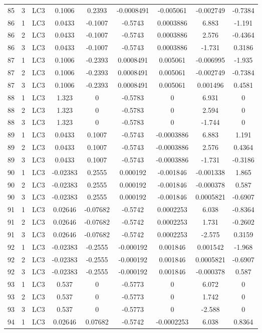 \documentclass{article}%
\begin{document}
\begin{longtable}{| c c c | c c c c c c |}
85&3&LC3&0.1006&0.2393&{-}0.0008491&{-}0.005061&{-}0.002749&{-}0.7384\\%
86&1&LC3&0.0433&{-}0.1007&{-}0.5743&0.0003886&6.883&{-}1.191\\%
86&2&LC3&0.0433&{-}0.1007&{-}0.5743&0.0003886&2.576&{-}0.4364\\%
86&3&LC3&0.0433&{-}0.1007&{-}0.5743&0.0003886&{-}1.731&0.3186\\%
87&1&LC3&0.1006&{-}0.2393&0.0008491&0.005061&{-}0.006995&{-}1.935\\%
87&2&LC3&0.1006&{-}0.2393&0.0008491&0.005061&{-}0.002749&{-}0.7384\\%
87&3&LC3&0.1006&{-}0.2393&0.0008491&0.005061&0.001496&0.4581\\%
88&1&LC3&1.323&0&{-}0.5783&0&6.931&0\\%
88&2&LC3&1.323&0&{-}0.5783&0&2.594&0\\%
88&3&LC3&1.323&0&{-}0.5783&0&{-}1.744&0\\%
89&1&LC3&0.0433&0.1007&{-}0.5743&{-}0.0003886&6.883&1.191\\%
89&2&LC3&0.0433&0.1007&{-}0.5743&{-}0.0003886&2.576&0.4364\\%
89&3&LC3&0.0433&0.1007&{-}0.5743&{-}0.0003886&{-}1.731&{-}0.3186\\%
90&1&LC3&{-}0.02383&0.2555&0.000192&{-}0.001846&{-}0.001338&1.865\\%
90&2&LC3&{-}0.02383&0.2555&0.000192&{-}0.001846&{-}0.000378&0.587\\%
90&3&LC3&{-}0.02383&0.2555&0.000192&{-}0.001846&0.0005821&{-}0.6907\\%
91&1&LC3&0.02646&{-}0.07682&{-}0.5742&0.0002253&6.038&{-}0.8364\\%
91&2&LC3&0.02646&{-}0.07682&{-}0.5742&0.0002253&1.731&{-}0.2602\\%
91&3&LC3&0.02646&{-}0.07682&{-}0.5742&0.0002253&{-}2.575&0.3159\\%
92&1&LC3&{-}0.02383&{-}0.2555&{-}0.000192&0.001846&0.001542&{-}1.968\\%
92&2&LC3&{-}0.02383&{-}0.2555&{-}0.000192&0.001846&0.0005821&{-}0.6907\\%
92&3&LC3&{-}0.02383&{-}0.2555&{-}0.000192&0.001846&{-}0.000378&0.587\\%
93&1&LC3&0.537&0&{-}0.5773&0&6.072&0\\%
93&2&LC3&0.537&0&{-}0.5773&0&1.742&0\\%
93&3&LC3&0.537&0&{-}0.5773&0&{-}2.588&0\\%
94&1&LC3&0.02646&0.07682&{-}0.5742&{-}0.0002253&6.038&0.8364\\%

\end{longtable}
\end{document}
